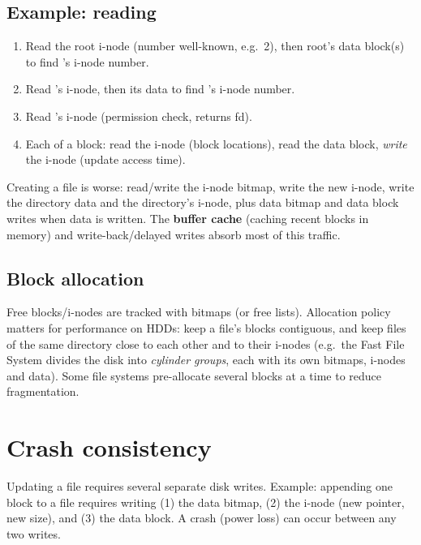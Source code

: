 \subsection{Example: reading }
\begin{enumerate}
  \item Read the root i-node (number well-known, e.g.\ 2), then root's data block(s) to find
    's i-node number.
  \item Read 's i-node, then its data to find 's i-node number.
  \item Read 's i-node (permission check,  returns fd).
  \item Each  of a block: read the i-node (block locations), read the data block,
    \emph{write} the i-node (update access time).
\end{enumerate}
Creating a file is worse: read/write the i-node bitmap, write the new i-node, write the
directory data and the directory's i-node, plus data bitmap and data block writes when data is
written. The \textbf{buffer cache} (caching recent blocks in memory) and write-back/delayed
writes absorb most of this traffic.

\subsection{Block allocation}
Free blocks/i-nodes are tracked with bitmaps (or free lists). Allocation policy matters for
performance on HDDs: keep a file's blocks contiguous, and keep files of the same directory close
to each other and to their i-nodes (e.g.\ the Fast File System divides the disk into
\emph{cylinder groups}, each with its own bitmaps, i-nodes and data). Some file systems
pre-allocate several blocks at a time to reduce fragmentation.

\section{Crash consistency}

Updating a file requires several separate disk writes. Example: appending one block to a file
requires writing (1) the data bitmap, (2) the i-node (new pointer, new size), and (3) the data
block. A crash (power loss) can occur between any two writes.

